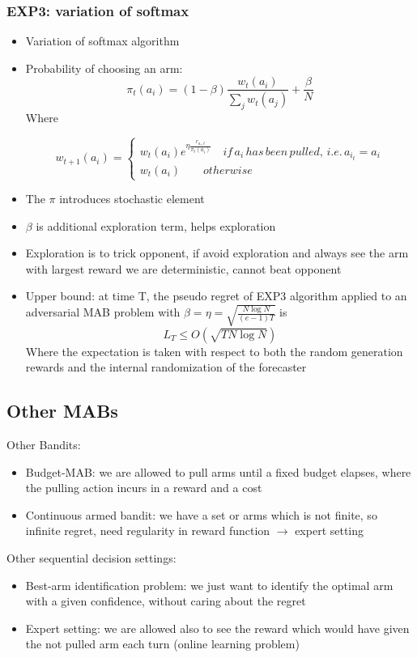 \subsubsection{EXP3: variation of softmax}
    \begin{itemize}
        \item Variation of softmax algorithm
        \item Probability of choosing an arm:
        $$\pi_t(a_i)=(1-\beta)\frac{w_t(a_i)}{\sum_jw_t(a_j)}+\frac{\beta}{N}$$
        Where
        \begin{LARGE}
            $$
            w_{t+1}(a_i)=
            \begin{cases}
                w_t(a_i)e^{\eta\frac{r_{a_i,t}}{\pi_t(a_i)}}\hspace{1em}if\,a_i\,has\,been\,pulled,\,i.e.\,a_{i_t}=a_i\\
                w_t(a_i)\hspace{2em} otherwise
            \end{cases}
            $$                
        \end{LARGE}
        \item The $\pi$ introduces stochastic element
        \item $\beta$ is additional exploration term, helps exploration
        \item Exploration is to trick opponent, if avoid exploration and always see the arm with largest reward we are deterministic, cannot beat opponent
        \item Upper bound: at time T, the pseudo regret of EXP3 algorithm applied to an adversarial MAB problem with $\beta=\eta=\sqrt{\frac{N\log N}{(e-1)T}}$ is
        $$L_T\leq O(\sqrt{TN\log N})$$
        Where the expectation is taken with respect to both the random generation rewards and the internal randomization of the forecaster
    \end{itemize}

\subsection{Other MABs}
    Other Bandits:
    \begin{itemize}
        \item Budget-MAB: we are allowed to pull arms until a fixed budget elapses, where the pulling action incurs in a reward and a cost
        \item Continuous armed bandit: we have a set or arms which is not finite, so infinite regret, need regularity in reward function $\rightarrow$ expert setting
    \end{itemize}
    Other sequential decision settings:
    \begin{itemize}
        \item Best-arm identification problem: we just want to identify the optimal arm with a given confidence, without caring about the regret
        \item Expert setting: we are allowed also to see the reward which would have given the not pulled arm each turn (online learning problem)
    \end{itemize}